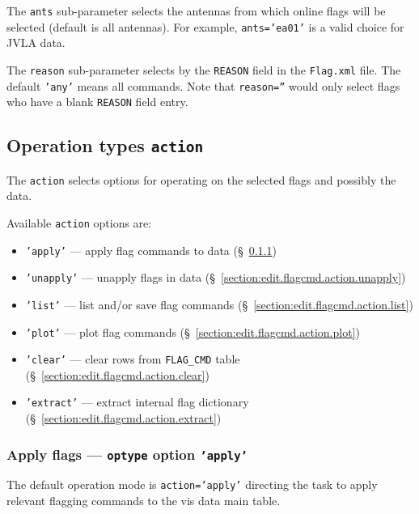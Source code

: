 The {\tt ants} sub-parameter selects the antennas from which
online flags will be selected (default is all antennas).  For example,
{\tt ants='ea01'} is a valid choice for JVLA data.

The {\tt reason} sub-parameter selects by the {\tt REASON} field in
the {\tt Flag.xml} file.  The default {\tt 'any'} means all commands.
Note that {\tt reason=''} would only select flags who have a blank {\tt REASON}
field entry.


\subsection{Operation types {\tt action}}
\label{section:edit.flagcmd.action}

The {\tt action} selects options for operating on the selected
flags and possibly the data.

Available {\tt action} options are:
\begin{itemize}
   \item {\tt 'apply'} --- apply flag commands to data (\S~\ref{section:edit.flagcmd.action.apply})
   \item {\tt 'unapply'} --- unapply flags in data (\S~\ref{section:edit.flagcmd.action.unapply})
   \item {\tt 'list'} ---  list and/or save flag commands (\S~\ref{section:edit.flagcmd.action.list})
   \item {\tt 'plot'} --- plot flag commands (\S~\ref{section:edit.flagcmd.action.plot})
   \item {\tt 'clear'} --- clear rows from {\tt FLAG\_CMD} table (\S~\ref{section:edit.flagcmd.action.clear})
   \item {\tt 'extract'} --- extract internal flag dictionary (\S~\ref{section:edit.flagcmd.action.extract})
\end{itemize}

\subsubsection{Apply flags --- {\tt optype} option {\tt 'apply'}}
\label{section:edit.flagcmd.action.apply}

The default operation mode is {\tt action='apply'} directing the
task to apply relevant flagging commands to the vis data main table.

